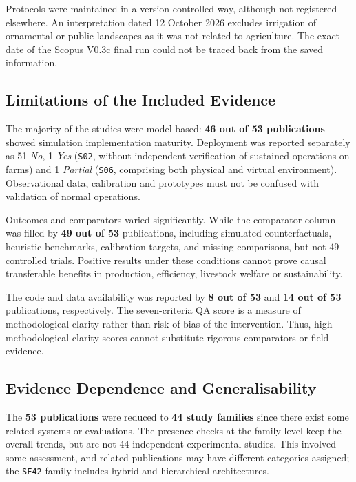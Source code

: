 \documentclass[11pt,a4paper]{article}
\begin{document}
Protocols were maintained in a version-controlled way, although not registered elsewhere. An interpretation dated 12 October 2026 excludes irrigation of ornamental or public landscapes as it was not related to agriculture. The exact date of the Scopus V0.3c final run could not be traced back from the saved information.

\subsection{Limitations of the Included Evidence}

The majority of the studies were model-based: \textbf{46 out of 53
publications} showed simulation implementation maturity. Deployment
was reported separately as 51 \emph{No}, 1 \emph{Yes}
(\texttt{S02}, without independent verification of sustained
operations on farms) and 1 \emph{Partial} (\texttt{S06},
comprising both physical and virtual environment). Observational
data, calibration and prototypes must not be confused with validation
of normal operations.

Outcomes and comparators varied significantly. While the comparator
column was filled by \textbf{49 out of 53} publications, including simulated counterfactuals, heuristic benchmarks, calibration targets, and missing comparisons, but not 49 controlled trials. Positive results under these conditions cannot prove causal transferable benefits in production, efficiency, livestock welfare or sustainability.

The code and data availability was reported by \textbf{8 out of 53}
and \textbf{14 out of 53} publications, respectively. The seven-criteria QA score is a measure of methodological clarity rather than risk of bias of the
intervention. Thus, high methodological clarity scores cannot substitute rigorous comparators or field evidence.

\subsection{Evidence Dependence and Generalisability}

The \textbf{53 publications} were reduced to \textbf{44 study families}
since there exist some related systems or evaluations. The presence
checks at the family level keep the overall trends, but are not 44
independent experimental studies. This involved some assessment, and
related publications may have different categories assigned; the
\texttt{SF42} family includes hybrid and hierarchical architectures.
\end{document}
